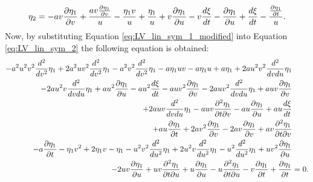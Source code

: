 \begin{equation}
  \eta_{2}=- a v \frac{\partial\eta_{1}}{\partial v} + \frac{a v \frac{\partial\eta_{1}}{\partial v}}{u} - \frac{\eta_{1} v}{u} + \frac{\eta_{1}}{u} + v \frac{\partial\eta_{1}}{\partial u} - v \frac{d\xi}{dt} - \frac{\partial\eta_{1}}{\partial u} + \frac{d\xi}{dt} - \frac{\frac{\partial\eta_1}{\partial t}}{u}.\\
  \label{eq:LV_lin_sym_1_modified}
\end{equation}
Now, by substituting Equation \eqref{eq:LV_lin_sym_1_modified} into Equation \eqref{eq:LV_lin_sym_2} the following equation is obtained:
\begin{align}
  - a^{2} u^{2} v^{2} \frac{d^{2}}{d v^{2}} \eta_{1} + 2 a^{2} u v^{2} \frac{d^{2}}{d v^{2}} \eta_{1} - a^{2} v^{2} \frac{d^{2}}{d v^{2}} \eta_{1} - a \eta_{1} u v - a \eta_{1} u + a \eta_{1} + 2 a u^{2} v^{2} \frac{d^{2}}{d vd u} \eta_{1}&\nonumber\\
  - 2 a u^{2} v \frac{d^{2}}{d vd u} \eta_{1} + a u^{2} \frac{\partial\eta_{1}}{\partial u} - a u^{2} \frac{d\xi}{dt} - a u v^{2} \frac{\partial\eta_{1}}{\partial v} - 2 a u v^{2} \frac{d^{2}}{d vd u} \eta_{1} + a u v \frac{\partial\eta_{1}}{\partial v} &\nonumber\\
  + 2 a u v \frac{d^{2}}{d vd u} \eta_{1} - a u v \pdv{\eta_1}{t}{v} - a u \frac{\partial\eta_{1}}{\partial u} + a u \frac{d\xi}{dt}&\nonumber\\
  + a u \frac{\partial\eta_1}{\partial t} + 2 a v^{2} \frac{\partial\eta_{1}}{\partial v} - 2 a v \frac{\partial\eta_{1}}{\partial v} + a v \pdv{\eta_1}{t}{v}&\nonumber\\
  - a \frac{\partial\eta_1}{\partial t} - \eta_{1} v^{2} + 2 \eta_{1} v - \eta_{1} - u^{2} v^{2} \frac{d^{2}}{d u^{2}} \eta_{1} + 2 u^{2} v \frac{d^{2}}{d u^{2}} \eta_{1} - u^{2} \frac{d^{2}}{d u^{2}} \eta_{1} + u v^{2} \frac{\partial\eta_{1}}{\partial u}&\nonumber\\
  - 2 u v \frac{\partial\eta_{1}}{\partial u} + u v \pdv{\eta_1}{t}{u} + u \frac{\partial\eta_{1}}{\partial u} - u \pdv{\eta_1}{t}{u} - v \frac{\partial\eta_1}{\partial t} + \frac{\partial\eta_1}{\partial t}&=0.\label{eq:LV_lin_sym_2_modified}
\end{align}
